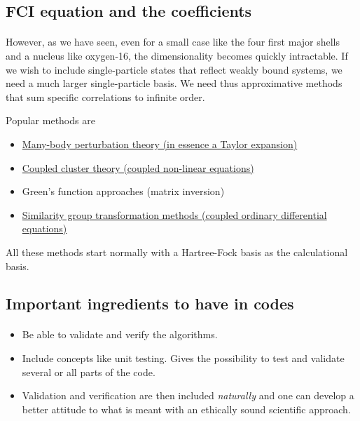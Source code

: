 \documentclass[%
oneside,                 %
final,                   %
10pt]{article}
\begin{document}
\subsection*{FCI equation and the coefficients}

\paragraph{}

However, as we have seen, even for a small case like the four first major shells and a nucleus like oxygen-16, the dimensionality becomes quickly intractable. If we wish to include single-particle states that reflect weakly bound systems, we need a much larger single-particle basis. We need thus approximative methods that sum specific correlations to infinite order. 

Popular methods are
\begin{itemize}
\item \href{{http://www.sciencedirect.com/science/article/pii/0370157395000126}}{Many-body perturbation theory (in essence a Taylor expansion)}

\item \href{{http://iopscience.iop.org/article/10.1088/0034-4885/77/9/096302/meta}}{Coupled cluster theory (coupled non-linear equations)}

\item Green's function approaches (matrix inversion)

\item \href{{http://journals.aps.org/prl/abstract/10.1103/PhysRevLett.106.222502}}{Similarity group transformation methods (coupled ordinary differential equations)}
\end{itemize}

\noindent
All these methods start normally with a Hartree-Fock basis as the calculational basis.



\subsection*{Important ingredients to have in codes}

\paragraph{}

\begin{itemize}
\item Be able to validate and verify  the  algorithms. 

\item Include concepts like unit testing. Gives the possibility to test and validate several or all parts of the code.

\item Validation and verification are then included \emph{naturally} and one can develop a better attitude to what is meant with an ethically sound scientific approach.
\end{itemize}
\end{document}

